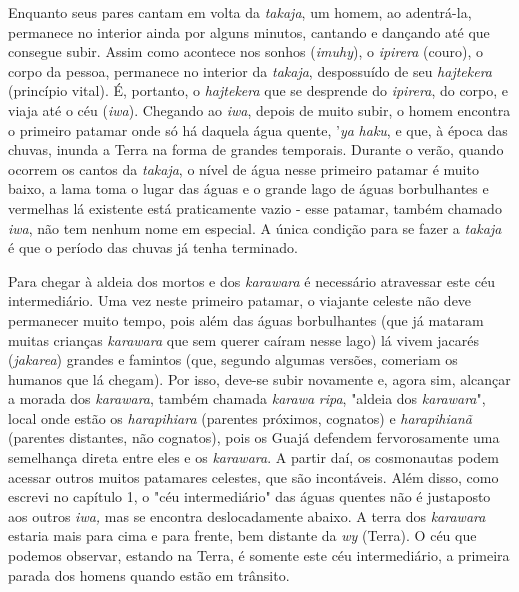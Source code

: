 Enquanto seus pares cantam em volta da \emph{takaja}, um homem, ao
adentrá-la, permanece no interior ainda por alguns minutos, cantando e
dançando até que consegue subir. Assim como acontece nos sonhos
(\emph{imuhy}), o \emph{ipirera} (couro), o corpo da pessoa, permanece
no interior da \emph{takaja}, despossuído de seu \emph{hajtekera}
(princípio vital). É, portanto, o \emph{hajtekera} que se desprende do
\emph{ipirera}, do corpo, e viaja até o céu (\emph{iwa}). Chegando ao
\emph{iwa}, depois de muito subir, o homem encontra o primeiro patamar
onde só há daquela água quente, '\emph{ya} \emph{haku}, e que, à época
das chuvas, inunda a Terra na forma de grandes temporais. Durante o
verão, quando ocorrem os cantos da \emph{takaja}, o nível de água nesse
primeiro patamar é muito baixo, a lama toma o lugar das águas e o grande
lago de águas borbulhantes e vermelhas lá existente está praticamente
vazio - esse patamar, também chamado \emph{iwa}, não tem nenhum nome em
especial. A única condição para se fazer a \emph{takaja} é que o período
das chuvas já tenha terminado.

Para chegar à aldeia dos mortos e dos \emph{karawara} é necessário
atravessar este céu intermediário. Uma vez neste primeiro patamar, o
viajante celeste não deve permanecer muito tempo, pois além das águas
borbulhantes (que já mataram muitas crianças \emph{karawara} que sem
querer caíram nesse lago) lá vivem jacarés (\emph{jakarea}) grandes e
famintos (que, segundo algumas versões, comeriam os humanos que lá
chegam). Por isso, deve-se subir novamente e, agora sim, alcançar a
morada dos \emph{karawara}, também chamada \emph{karawa} \emph{ripa},
"aldeia dos \emph{karawara}", local onde estão os \emph{harapihiara}
(parentes próximos, cognatos) e \emph{harapihianã} (parentes distantes,
não cognatos), pois os Guajá defendem fervorosamente uma semelhança
direta entre eles e os \emph{karawara}. A partir daí, os cosmonautas
podem acessar outros muitos patamares celestes, que são incontáveis.
Além disso, como escrevi no capítulo 1, o "céu intermediário" das águas
quentes não é justaposto aos outros \emph{iwa,} mas se encontra
deslocadamente abaixo. A terra dos \emph{karawara} estaria mais para
cima e para frente, bem distante da \emph{wy} (Terra). O céu que podemos
observar, estando na Terra, é somente este céu intermediário, a primeira
parada dos homens quando estão em trânsito.

